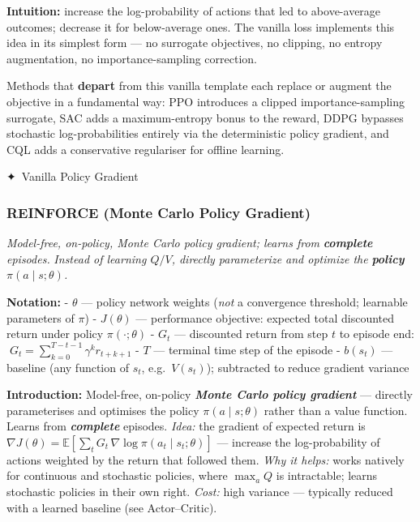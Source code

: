 \documentclass[11pt]{article}
\begin{document}
\textbf{Intuition:} increase the log-probability of actions that led to
above-average outcomes; decrease it for below-average ones. The vanilla
loss implements this idea in its simplest form --- no surrogate
objectives, no clipping, no entropy augmentation, no importance-sampling
correction.

Methods that \textbf{depart} from this vanilla template each replace or
augment the objective in a fundamental way: PPO introduces a clipped
importance-sampling surrogate, SAC adds a maximum-entropy bonus to the
reward, DDPG bypasses stochastic log-probabilities entirely via the
deterministic policy gradient, and CQL adds a conservative regulariser
for offline learning.

    {✦ Vanilla Policy Gradient}

    \clearpage

\label{reinforce}

    \subsubsection{REINFORCE (Monte Carlo Policy
Gradient)}\label{reinforce-monte-carlo-policy-gradient}

    \emph{Model-free, on-policy, Monte Carlo policy gradient; learns from}
\textbf{\emph{complete}} \emph{episodes.} \emph{Instead of learning
\(Q/V\), directly parameterize and optimize the} \textbf{\emph{policy}}
\(\pi(a \mid s;\theta)\)\emph{.}

    \textbf{Notation:} - \(\theta\) --- policy network weights (\emph{not} a
convergence threshold; learnable parameters of \(\pi\)) - \(J(\theta)\)
--- performance objective: expected total discounted return under policy
\(\pi(\cdot;\theta)\) - \(G_t\) --- discounted return from step \(t\) to
episode end: \(\;G_t = \sum_{k=0}^{T-t-1}\gamma^k r_{t+k+1}\) - \(T\)
--- terminal time step of the episode - \(b(s_t)\) --- baseline (any
function of \(s_t\), e.g.~\(V(s_t)\)); subtracted to reduce gradient
variance

    \label{intro-4-1}

    \textbf{Introduction:} Model-free, on-policy \textbf{\emph{Monte Carlo
policy gradient}} --- directly parameterises and optimises the policy
\(\pi(a \mid s;\theta)\) rather than a value function. Learns from
\textbf{\emph{complete}} episodes. \emph{Idea:} the gradient of expected
return is
\(\nabla J(\theta) = \mathbb{E}\!\left[\sum_t G_t\, \nabla\log\pi(a_t \mid s_t;\theta)\right]\)
--- increase the log-probability of actions weighted by the return that
followed them. \emph{Why it helps:} works natively for continuous and
stochastic policies, where \(\max_a Q\) is intractable; learns
stochastic policies in their own right. \emph{Cost:} high variance ---
typically reduced with a learned baseline (see Actor--Critic).
\end{document}
